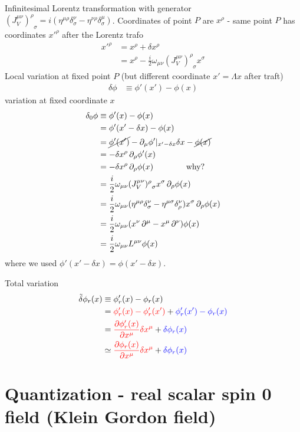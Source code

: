 \documentclass[10pt,a4paper]{report}
\theoremstyle{definition}
\begin{document}
Infinitesimal Lorentz transformation with generator $(J_V^{\mu\nu})^\rho_{\;\;\sigma}=i(\eta^{\mu\rho}\delta^\nu_\sigma-\eta^{\nu\rho}\delta^\mu_\sigma)$. Coordinates of point $P$ are $x^\rho$ - same point $P$ has coordinates $x'^\rho$ after the Lorentz trafo
\begin{align}
x'^\rho
&=x^\rho+\delta x^\rho\\
&=x^\rho-\frac{i}{2}\omega_{\mu\nu}(J_V^{\mu\nu})^\rho_{\;\;\sigma}x^\sigma
\end{align}
Local variation at fixed point $P$ (but different coordinate $x'=\Lambda x$ after traft)
\begin{align}
\delta \phi&\equiv\phi'(x')-\phi(x)
\end{align}
variation at fixed coordinate $x$ 
\begin{align}
\delta_0 \phi
&\equiv\phi'(x)-\phi(x)\\
&=\phi'(x'-\delta x)-\phi(x)\\
&=\cancel{\phi'(x')}-\partial_\mu\phi'|_{x'-\delta x}\delta x-\cancel{\phi(x)}\\
&=-\delta x^\rho\,\partial_\rho\phi'(x)\\
&=-\delta x^\rho\,\partial_\rho\phi(x)\qquad\qquad\text{why?}\\
&=\frac{i}{2}\omega_{\mu\nu}(J_V^{\mu\nu})^\rho_{\;\;\sigma}x^\sigma\,\partial_\rho\phi(x)\\
&=\frac{i}{2}\omega_{\mu\nu}(\eta^{\mu\rho}\delta^\nu_\sigma-\eta^{\mu\sigma}\delta^\nu_\rho)x^\sigma\,\partial_\rho\phi(x)\\
&=\frac{i}{2}\omega_{\mu\nu}(x^\nu\,\partial^\mu-x^\mu\,\partial^\nu)\phi(x)\\
&=\frac{i}{2}\omega_{\mu\nu}L^{\mu\nu}\phi(x)
\end{align}
where we used $\phi'(x'-\delta x)=\phi(x'-\delta x)$.

Total variation 
\begin{align}
\tilde\delta\phi_r(x)
&\equiv\phi'_r(x)-\phi_r(x)\\
&=\textcolor{red}{\phi'_r(x)-\phi'_r(x')}+\textcolor{blue}{\phi'_r(x')-\phi_r(x)}\\
&=\textcolor{red}{\frac{\partial\phi'_r(x)}{\partial x^\mu}\delta x^\mu}+\textcolor{blue}{\delta\phi_r(x)}\\
&\simeq\textcolor{red}{\frac{\partial\phi_r(x)}{\partial x^\mu}\delta x^\mu}+\textcolor{blue}{\delta\phi_r(x)}
\end{align}  

\newpage
\section{Quantization - real scalar spin 0 field (Klein Gordon field)}
\end{document}
